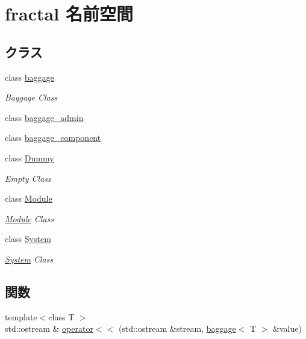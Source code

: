 \section{fractal 名前空間}
\label{namespacefractal}
\subsection*{クラス}
\begin{DoxyCompactItemize}
\item 
class \hyperlink{classfractal_1_1baggage}{baggage}
\begin{DoxyCompactList}\small\item\em Baggage Class \end{DoxyCompactList}\item 
class \hyperlink{classfractal_1_1baggage__admin}{baggage\+\_\+admin}
\item 
class \hyperlink{classfractal_1_1baggage__component}{baggage\+\_\+component}
\item 
class \hyperlink{classfractal_1_1Dummy}{Dummy}
\begin{DoxyCompactList}\small\item\em Empty Class \end{DoxyCompactList}\item 
class \hyperlink{classfractal_1_1Module}{Module}
\begin{DoxyCompactList}\small\item\em \hyperlink{classfractal_1_1Module}{Module} Class \end{DoxyCompactList}\item 
class \hyperlink{classfractal_1_1System}{System}
\begin{DoxyCompactList}\small\item\em \hyperlink{classfractal_1_1System}{System} Class \end{DoxyCompactList}\end{DoxyCompactItemize}
\subsection*{関数}
\begin{DoxyCompactItemize}
\item 
{\footnotesize template$<$class T $>$ }\\std\+::ostream \& \hyperlink{namespacefractal_abe8d2436bc90b6911384070a496cc49a}{operator$<$$<$} (std\+::ostream \&stream, \hyperlink{classfractal_1_1baggage}{baggage}$<$ T $>$ \&value)
\end{DoxyCompactItemize}
